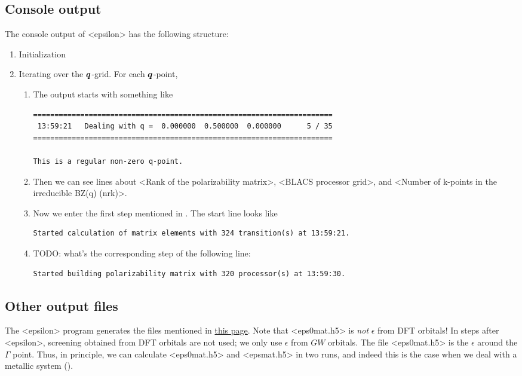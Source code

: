 \documentclass[hyperref, a4paper, 12pt]{report}
\def\texttt#1{<#1>}%
\newcommand{\shortcode}[1]{\texttt{#1}}
\begin{document}
\subsection{Console output}

The console output of \shortcode{epsilon} has the following structure:
\begin{enumerate}
    \item Initialization
    \item Iterating over the $\vb*{q}$-grid. For each $\vb*{q}$-point,
    \begin{enumerate}
        \item  The output starts with something like
        \begin{lstlisting}
====================================================================== 
 13:59:21   Dealing with q =  0.000000  0.500000  0.000000      5 / 35
======================================================================

This is a regular non-zero q-point.
        \end{lstlisting}
        \item Then we can see lines about 
        \shortcode{Rank of the polarizability matrix},
        \shortcode{BLACS processor grid},
        and \shortcode{Number of k-points in the irreducible BZ(q) (nrk)}.
        \item Now we enter the first step mentioned in .
        The start line looks like
        \begin{lstlisting}
Started calculation of matrix elements with 324 transition(s) at 13:59:21.
        \end{lstlisting}
        \item TODO: what's the corresponding step of the following line:
        \begin{lstlisting}
Started building polarizability matrix with 320 processor(s) at 13:59:30.
        \end{lstlisting}
    \end{enumerate}
\end{enumerate}

\subsection{Other output files}

The \shortcode{epsilon} program generates the files mentioned in 
\href{http://manual.berkeleygw.org/2.0/epsilon-overview/}{this page}.
Note that \shortcode{eps0mat.h5} is \emph{not} $\epsilon$ from DFT orbitals!
In steps after \shortcode{epsilon},
screening obtained from DFT orbitals are not used;
we only use $\epsilon$ from $GW$ orbitals.
The file \shortcode{eps0mat.h5} is the $\epsilon$ around the $\Gamma$ point.
Thus, in principle,
we can calculate \shortcode{eps0mat.h5} and \shortcode{epsmat.h5}
in two runs,
and indeed this is the case when we deal with a metallic system
().
\end{document}
